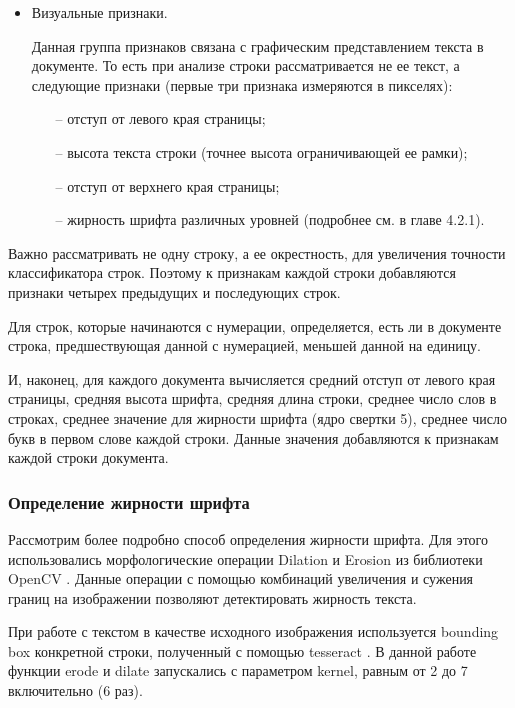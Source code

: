 \documentclass{ProcISPRAS}
\begin{document}
\begin{itemize}
  \item Визуальные признаки.
  
  Данная группа признаков связана с графическим представлением текста в документе. То есть при анализе строки рассматривается не ее текст, а следующие признаки (первые три признака измеряются в пикселях):

  \begin{itemize}

    \item[--] отступ от левого края страницы;
    \item[--] высота текста строки (точнее высота ограничивающей ее рамки);
    \item[--] отступ от верхнего края страницы;
    \item[--] жирность шрифта различных уровней (подробнее см. в главе 4.2.1).
    
     \end{itemize}

\end{itemize}

Важно рассматривать не одну строку, а ее окрестность, для увеличения точности классификатора строк. Поэтому к признакам каждой строки добавляются признаки четырех предыдущих и последующих строк.

Для строк, которые начинаются с нумерации, определяется, есть ли в документе строка, предшествующая данной с нумерацией, меньшей данной на единицу.

И, наконец, для каждого документа вычисляется средний отступ от левого края страницы, средняя высота шрифта, средняя длина строки, среднее число слов в строках, среднее значение для жирности шрифта (ядро свертки 5), среднее число букв в первом слове каждой строки. Данные значения добавляются к признакам каждой строки документа.

\subsubsection{Определение жирности шрифта}
Рассмотрим более подробно способ определения жирности шрифта. Для этого использовались морфологические операции Dilation и Erosion \cite{operations} из библиотеки OpenCV \cite{opencv}. Данные операции с помощью комбинаций увеличения и сужения границ на изображении позволяют детектировать жирность текста.

При работе с текстом в качестве исходного изображения используется bounding box конкретной строки, полученный с помощью tesseract \cite{tesseract}. В данной работе функции erode и dilate запускались с параметром kernel, равным от 2 до 7 включительно (6 раз).
\end{document}
